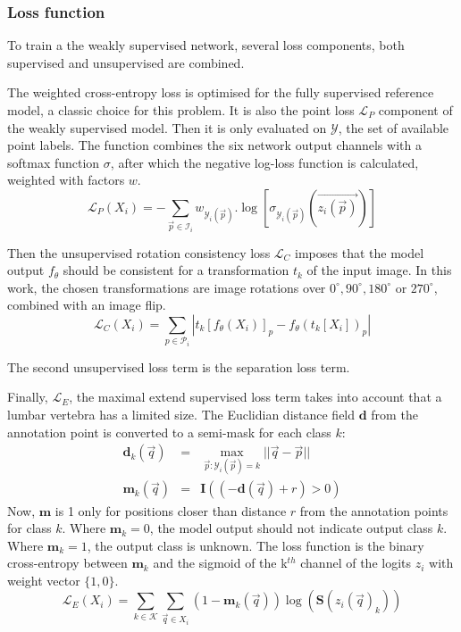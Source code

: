 \begin{multicols}{2}
\subsubsection*{Loss function}
\par{
    To train a the weakly supervised network, several loss components, both supervised and unsupervised are combined.
}
\par{
    The weighted cross-entropy loss is optimised for the fully supervised reference model, a classic choice for this problem.
    It is also the point loss $\mathcal{L}_P$ component of the weakly supervised model. Then it is only evaluated on $\mathcal{Y}$, the set of available point labels.
    The function combines the six network output channels with a softmax function $\sigma$, after which the negative log-loss function is calculated, weighted with factors $w$.
}
\begin{equation} \label{eq:crossEntropy}
    \mathcal{L}_P(X_i) = -\sum_{\vec{p} \in \mathcal{I}_i} w_{\mathcal{Y}_i(\vec{p})}.\log\left[\sigma_{\mathcal{Y}_i(\vec{p})}\left(\vec{z_i(\vec{p})}\right)\right]
\end{equation}
\par{
    Then the unsupervised rotation consistency loss $\mathcal{L}_C$  imposes that the model output $f_\theta$ should be consistent for a transformation $t_k$ of the input image.
    In this work, the chosen transformations are image rotations over $0^\circ, 90^\circ, 180^\circ$ or $270^\circ$, combined with an image flip.
}
\begin{equation}
    \mathcal{L}_C(X_i) = \sum_{p \in \mathcal{P}_i} \left| t_k\left[f_\theta(X_i)\right]_p - f_\theta\left( t_k[X_i] \right)_p  \right|  
\end{equation}
\par{
    The second unsupervised loss term is the separation loss term.  
}
\par{
    Finally, $\mathcal{L}_E$, the maximal extend supervised loss term takes into account that a lumbar vertebra has a limited size.
    The Euclidian distance field $\mathbf{d}$ from the annotation point is converted to a semi-mask for each class $k$:
    \begin{eqnarray}
        \mathbf{d}_k(\vec{q}) &=& \max_{\vec{p}:\mathcal{Y}_i(\vec{p})=k}||\vec{q} - \vec{p}||\\
        \mathbf{m}_k(\vec{q}) &=& \mathbf{I}\left( (-\mathbf{d}(\vec{q}) + r) > 0 \right)
    \end{eqnarray}
    Now, $\mathbf{m}$ is 1 only for positions closer than distance $r$ from the annotation points for class $k$.
    Where $\mathbf{m}_k=0$, the model output should not indicate output class $k$. Where $\mathbf{m}_k=1$, the output class is unknown.
    The loss function is the binary cross-entropy between $\mathbf{m}_k$ and the sigmoid of the k$^{th}$ channel of the logits $z_i$ with weight vector $\{1, 0\}$.
}
\begin{equation}
    \mathcal{L}_E(X_i) = \sum_{k\in\mathcal{K}}\sum_{\vec{q}\in X_i}  (1-\mathbf{m}_k(\vec{q})) \log(\mathbf{S}(z_i(\vec{q})_k)) 
\end{equation}


\end{multicols}
